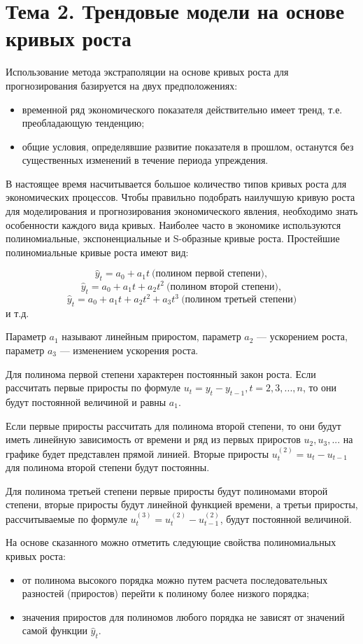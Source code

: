 \section{Тема 2. Трендовые модели на основе кривых роста}

Использование метода экстраполяции на основе кривых роста для прогнозирования базируется на двух предположениях:
\begin{itemize}
	\item временной ряд экономического показателя действительно имеет тренд, т.е. преобладающую тенденцию;
	\item общие условия, определявшие развитие показателя в прошлом, останутся без существенных изменений в течение периода упреждения.
\end{itemize}

В настоящее время насчитывается большое количество типов кривых роста для экономических процессов. Чтобы правильно подобрать наилучшую кривую роста для моделирования и прогнозирования экономического явления, необходимо знать особенности каждого вида кривых. Наиболее часто в экономике используются полиномиальные, экспоненциальные и S-образные кривые роста. Простейшие полиномиальные кривые роста имеют вид:

\[ \hat{y}_t = a_0 + a_1t \ \text{(полином первой степени)},\]
\[ \hat{y}_t = a_0 + a_1t +a_2t^2 \ \text{(полином второй степени)},\]
\[ \hat{y}_t = a_0 + a_1t +a_2t^2 + a_3t^3 \ \text{(полином третьей степени)}\]
и т.д.

Параметр $a_1$ называют линейным приростом, параметр $a_2$ --- ускорением роста, параметр $a_3$ --- изменением ускорения роста.

Для полинома первой степени характерен постоянный закон роста. Если рассчитать первые приросты по формуле $u_t = y_t - y_{t-1}, t = 2, 3, ..., n$, то они будут постоянной величиной и равны $a_1$.

Если первые приросты рассчитать для полинома второй степени, то они будут иметь линейную зависимость от времени и ряд из первых приростов $u_2, u_3, ...$ на графике будет представлен прямой линией. Вторые приросты $u_t^{(2)} = u_t - u_{t-1}$ для полинома второй степени будут постоянны.

Для полинома третьей степени первые приросты будут полиномами второй степени, вторые приросты будут линейной функцией времени, а третьи приросты, рассчитываемые по формуле $u_t^{(3)} = u_t^{(2)} - u_{t-1}^{(2)}$, будут постоянной величиной.

На основе сказанного можно отметить следующие свойства полиномиальных кривых роста:
\begin{itemize}
	\item от полинома высокого порядка можно путем расчета последовательных разностей (приростов) перейти к полиному более низкого порядка;
	\item значения приростов для полиномов любого порядка не зависят от значений самой функции $\hat{y}_t$.
\end{itemize}

